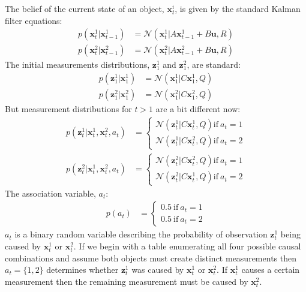 The belief of the current state of an object, $\pmb{x}_{t}^{i}$, is given by the standard Kalman filter equations:
\begin{align}
p\left(\pmb{x}_{t}^{1} | \pmb{x}_{t-1}^{1} \right) &= \mathcal{N}\left( \pmb{x}_{t}^{1} | A \pmb{x}_{t-1}^{1} + B \pmb{u}, R \right) \\
p\left(\pmb{x}_{t}^{2} | \pmb{x}_{t-1}^{2} \right) &= \mathcal{N}\left( \pmb{x}_{t}^{2} | A \pmb{x}_{t-1}^{2} + B \pmb{u}, R \right)
\end{align}
The initial measurements distributions, $\pmb{z}_{1}^{1}$ and $\pmb{z}_{1}^{2}$, are standard:
\begin{align}
p\left(\pmb{z}_{1}^{1} | \pmb{x}_{1}^{1} \right) &= \mathcal{N}\left( \pmb{x}_{1}^{1} | C \pmb{x}_{1}^{1}, Q \right) \\
p\left(\pmb{z}_{1}^{2} | \pmb{x}_{1}^{2} \right) &= \mathcal{N}\left( \pmb{x}_{1}^{2} | C \pmb{x}_{1}^{2}, Q \right)
\end{align}
But measurement distributions for $t > 1$ are a bit different now:
\begin{align}
p\left(\pmb{z}_{t}^{1} | \pmb{x}_{t}^{1}, \pmb{x}_{t}^{2}, a_{t} \right) &= 
\begin{cases} 
\mathcal{N}\left( \pmb{z}_{t}^{1} | C \pmb{x}_{t}^{1}, Q \right) \mbox{if} \ a_{t} = 1 \\
\mathcal{N}\left( \pmb{z}_{t}^{1} | C \pmb{x}_{t}^{2}, Q \right) \mbox{if} \ a_{t} = 2
\end{cases} \\
p\left(\pmb{z}_{t}^{2} | \pmb{x}_{t}^{1}, \pmb{x}_{t}^{2}, a_{t} \right) &= 
\begin{cases} 
 \mathcal{N}\left( \pmb{z}_{t}^{2} | C \pmb{x}_{t}^{2}, Q \right) \mbox{if} \ a_{t} = 1 \\
\mathcal{N}\left( \pmb{z}_{t}^{2} | C \pmb{x}_{t}^{1}, Q \right) \mbox{if} \ a_{t} = 2
\end{cases}
\end{align}
The association variable, $a_{t}$:
\begin{align}
p\left(a_{t}\right) &= 
\begin{cases}
0.5 \ \mbox{if} \ a_{t} = 1 \\
0.5 \ \mbox{if} \ a_{t} = 2
\end{cases} 
\end{align}
$a_{t}$ is a binary random variable describing the probability of observation $\pmb{z}_{t}^{1}$ being caused by $\pmb{x}_{t}^{1}$  or $\pmb{x}_{t}^{2}$. If we begin with a table enumerating all four possible causal combinations and assume both objects must create distinct measurements then $a_{t} = \{ 1, 2 \}$ determines whether $\pmb{z}_{t}^{1}$ was caused by $\pmb{x}_{t}^{1}$ or $\pmb{x}_{t}^{2}$. If  $\pmb{x}_{t}^{1}$ causes a certain measurement then the remaining measurement must be caused by $\pmb{x}_{t}^{2}$.

